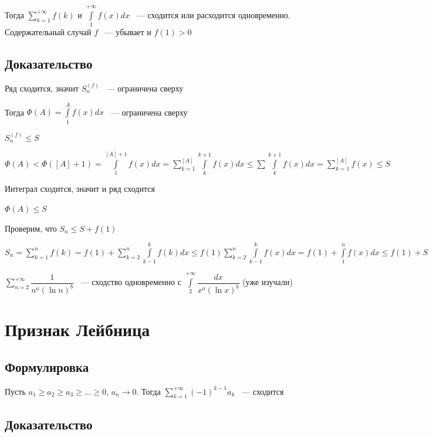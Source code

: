 \documentclass{article}
\begin{document}
            Тогда $\sum\limits^{+\infty}_{k = 1} f(k)$ и $\int\limits^{+\infty}_1 f(x) dx$ ~--- сходится или расходится одновременно. Содержательный случай $f$ ~--- убывает и $f(1) > 0$
            
        \subsection{Доказательство}
        
            Ряд сходится, значит $S^{(f)}_n$ ~--- ограничена сверху
            
            Тогда $\Phi(A) = \int\limits^A_1 f(x) dx$ ~--- ограничена сверху
            
            $S^{(f)}_n \leq S$
            
            $\Phi(A) < \Phi([A] + 1) = \int\limits^{[A] + 1}_1 f(x) dx = \sum\limits^{[A]}_{k = 1} \int\limits^{k + 1}_k f(x)dx \leq \sum \int\limits^{k + 1}_k f(x) dx = \sum\limits^{[A]}_{k = 1} f(x) \leq S$
            
            Интеграл сходится, значит и ряд сходится
            
            $\Phi(A) \leq S$
            
            Проверим, что $S_n \leq S + f(1)$
            
            $S_n = \sum\limits^n_{k = 1} f(k) = f(1) + \sum\limits^n_{k = 2} \int\limits^k_{k - 1} f(k) dx \leq f(1) \sum\limits^n_{k = 2} \int\limits^k_{k - 1} f(x) dx = f(1) + \int\limits^n_1 f(x) dx \leq f(1) + S$
            
            $\sum\limits^{+\infty}_{n = 2} \dfrac{1}{n^a (\ln n)^b}$ ~--- сходство одновременно с $\int\limits^{+\infty}_2 \dfrac{dx}{x^a(\ln{x})^b}$ (уже изучали)
            
    \newpage
    
    \section{Признак Лейбница}
    
        \subsection{Формулировка}
        
            Пусть $a_1 \geq a_2 \geq a_3 \geq \ldots \geq 0$, $a_n \rightarrow 0$. Тогда $\sum\limits^{+\infty}_{k = 1} (-1)^{k - 1} a_k$ ~--- сходится
            
        \subsection{Доказательство}
        
\end{document}

